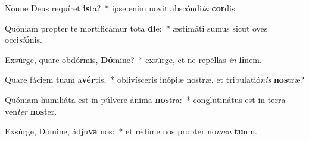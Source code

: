 \item Nonne Deus requíret \textbf{is}ta?~* ipse enim novit abscóndi\textit{ta} \textbf{cor}dis.
\item Quóniam propter te mortificámur tota \textbf{di}e:~* æstimáti sumus sicut oves occi\textit{si}\textbf{ó}nis.
\item Exsúrge, quare obdórmis, \textbf{Dó}mine?~* exsúrge, et ne repéllas \textit{in} \textbf{fi}nem.
\item Quare fáciem tuam a\textbf{vér}tis,~* oblivísceris inópiæ nostræ, et tribulatió\textit{nis} \textbf{nos}træ?
\item Quóniam humiliáta est in púlvere ánima \textbf{nos}tra:~* conglutinátus est in terra ven\textit{ter} \textbf{nos}ter.
\item Exsúrge, Dómine, ádju\textbf{va} nos:~* et rédime nos propter no\textit{men} \textbf{tu}um.
